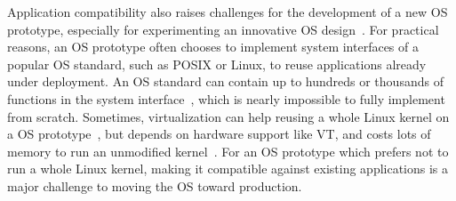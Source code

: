 \begin{comment}
However, implementing compatibility can cause a dilemma, when supporting a new hardware platform that affects a large amount of system interfaces.
For example, an unconventional memory architecture, such as NUMA (Non-uniform Memory Architecture) would affect every system interface that access shared, kernel state across memory units.
As another example,
the Intel SGX (Software Guard Extensions) moves an application into an isolated environment protected by the CPU, and treats all system interfaces
provided by the OS as untrustworthy.
Supporting these new hardware platforms, for the existing, unmodified applications, 
poses a tremendous challenge for OS developers.
OS developers have to update a substantial portion of the OS implementation,
without disrupting the support for existing system interfaces.
The OS development process can be both painful and time-comsuming.
\end{comment}



Application compatibility also raises challenges for the development of a new OS prototype,
especially for experimenting an innovative OS design~\cite{baumann09barrelfish,unikernels,zeldovich+histar,libra,peter14arrakis,belay14ix}.
For practical reasons, 
an OS prototype often chooses to implement system interfaces of a popular OS standard, such as POSIX or Linux, to reuse applications already under deployment.
An OS standard can contain up to hundreds or thousands of functions in the system interface~\cite{ieee-posix, linux-man-syscall},
which is nearly impossible to fully implement from scratch.
Sometimes, virtualization can help reusing a whole Linux kernel on a OS prototype~\cite{baumann09barrelfish}, but depends on hardware support like VT, and costs lots of memory to run an unmodified kernel~\cite{agarwal15container}.
For an OS prototype which prefers not to run a whole Linux kernel, making it compatible against existing applications is a major challenge to moving the OS toward production.


